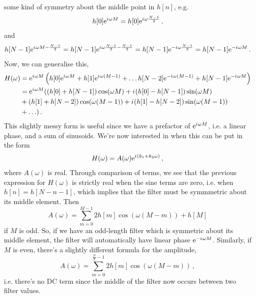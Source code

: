 some kind of symmetry about the middle point in $h[n]$, e.g.
%
\begin{displaymath}
  h[0]\mathrm{e}^{{i\mkern1mu}\omega M} = h[0]\mathrm{e}^{{i\mkern1mu}\omega\frac{N-1}{2}} \,,
\end{displaymath}
%
and
%
\begin{displaymath}
  h[N-1]\mathrm{e}^{{i\mkern1mu}\omega M - \frac{N-1}{2}} = h[N-1]\mathrm{e}^{{i\mkern1mu}\omega\frac{N-1}{2} - \frac{N-1}{2}}
  = h[N-1]\mathrm{e}^{-{i\mkern1mu}\omega\frac{N-1}{2}} = h[N-1]\mathrm{e}^{-{i\mkern1mu}\omega M} \,.
\end{displaymath}
%
Now, we can generalise this,
%
\begin{align*}
  H(\omega) &= \mathrm{e}^{{i\mkern1mu}\omega M}\left(
  h[0]\mathrm{e}^{{i\mkern1mu}\omega M} + h[1]\mathrm{e}^{{i\mkern1mu}\omega(M-1)} + \hdots h[N-2]\mathrm{e}^{-{i\mkern1mu}\omega(M-1)} + h[N-1]\mathrm{e}^{-{i\mkern1mu}\omega M}
  \right) \\
  &= \mathrm{e}^{{i\mkern1mu}\omega M}(
  (h[0] + h[N-1])\cos(\omega M) + {i\mkern1mu}(h[0] - h[N-1])\sin(\omega M)\\
  &+ (h[1] + h[N-2])\cos(\omega (M - 1)) + {i\mkern1mu}(h[1] - h[N-2])\sin(\omega (M-1))\\
  &+ \hdots) \,.
\end{align*}
%
This slightly messy form is useful since we have a prefactor of $\mathrm{e}^{{i\mkern1mu}\omega M}$, i.e.
a linear phase, and a sum of sinusoids. We're now interested in when this can
be put in the form
%
\begin{displaymath}
  H(\omega) = A(\omega) \mathrm{e}^{{i\mkern1mu}(k_1 + k_2\omega)} \,,
\end{displaymath}
%
where $A(\omega)$ is real. Through comparison of terms, we see that the previous
expression for $H(\omega)$ is strictly real when the sine terms are zero, i.e.
when $h[n] = h[N-n-1]$, which implies that the filter must be symmmetric about
its middle element. Then
%
\begin{displaymath}
  A(\omega) = \sum_{m=0}^{M-1}2h[m]\cos(\omega(M-m)) + h[M]
\end{displaymath}
%
if $M$ is odd. So, if we have an odd-length filter which is symmetric about its
middle element, the filter will automatically have linear phase $\mathrm{e}^{-{i\mkern1mu}\omega M}$.
Similarly, if $M$ is even, there's a slightly different formula for the amplitude,
%
\begin{displaymath}
  A(\omega) = \sum_{m=0}^{\frac{N}{2}-1}2h[m]\cos(\omega(M-m)) \,,
\end{displaymath}
%
i.e. there's no DC term since the middle of the filter now occurs between
two filter values.\\

